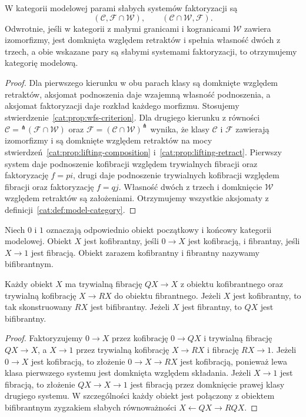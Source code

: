 \begin{stwierdzenie}\label{cat:prop:model-wfs}
W kategorii modelowej parami słabych systemów faktoryzacji są
\[
 (\mathcal C,\mathcal F\cap\mathcal W),\qquad
 (\mathcal C\cap\mathcal W,\mathcal F).
\]
Odwrotnie, jeśli w kategorii z małymi granicami i kogranicami $\mathcal W$ zawiera izomorfizmy, jest domknięta względem retraktów i spełnia własność dwóch z trzech, a obie wskazane pary są słabymi systemami faktoryzacji, to otrzymujemy kategorię modelową.
\end{stwierdzenie}
\begin{proof}
Dla pierwszego kierunku w obu parach klasy są domknięte względem retraktów, aksjomat podnoszenia daje wzajemną własność podnoszenia, a aksjomat faktoryzacji daje rozkład każdego morfizmu. Stosujemy stwierdzenie~\ref{cat:prop:wfs-criterion}. Dla drugiego kierunku z równości $\mathcal C={}^\pitchfork(\mathcal F\cap\mathcal W)$ oraz $\mathcal F=(\mathcal C\cap\mathcal W)^\pitchfork$ wynika, że klasy $\mathcal C$ i $\mathcal F$ zawierają izomorfizmy i są domknięte względem retraktów na mocy stwierdzeń~\ref{cat:prop:lifting-composition} i~\ref{cat:prop:lifting-retract}. Pierwszy system daje podnoszenie kofibracji względem trywialnych fibracji oraz faktoryzację $f=pi$, drugi daje podnoszenie trywialnych kofibracji względem fibracji oraz faktoryzację $f=qj$. Własność dwóch z trzech i domknięcie $\mathcal W$ względem retraktów są założeniami. Otrzymujemy wszystkie aksjomaty z definicji~\ref{cat:def:model-category}.
\end{proof}

\begin{definicja}\label{cat:def:cofibrant-fibrant}
Niech $0$ i $1$ oznaczają odpowiednio obiekt początkowy i końcowy kategorii modelowej. Obiekt $X$ jest kofibrantny, jeśli $0\to X$ jest kofibracją, i fibrantny, jeśli $X\to1$ jest fibracją. Obiekt zarazem kofibrantny i fibrantny nazywamy bifibrantnym.
\end{definicja}

\begin{wniosek}[Zastąpienia]\label{cat:cor:model-replacements}
Każdy obiekt $X$ ma trywialną fibrację $QX\to X$ z obiektu kofibrantnego oraz trywialną kofibrację $X\to RX$ do obiektu fibrantnego. Jeżeli $X$ jest kofibrantny, to tak skonstruowany $RX$ jest bifibrantny. Jeżeli $X$ jest fibrantny, to $QX$ jest bifibrantny.
\end{wniosek}
\begin{proof}
Faktoryzujemy $0\to X$ przez kofibrację $0\to QX$ i trywialną fibrację $QX\to X$, a $X\to1$ przez trywialną kofibrację $X\to RX$ i fibrację $RX\to1$. Jeżeli $0\to X$ jest kofibracją, to złożenie $0\to X\to RX$ jest kofibracją, ponieważ lewa klasa pierwszego systemu jest domknięta względem składania. Jeżeli $X\to1$ jest fibracją, to złożenie $QX\to X\to1$ jest fibracją przez domknięcie prawej klasy drugiego systemu. W szczególności każdy obiekt jest połączony z obiektem bifibrantnym zygzakiem słabych równoważności $X\leftarrow QX\to RQX$.
\end{proof}

